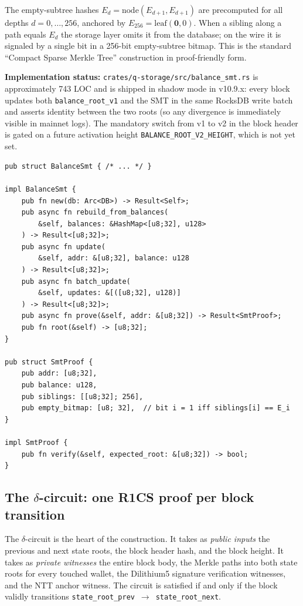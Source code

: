 \documentclass[11pt,a4paper]{article}
\begin{document}
The empty-subtree hashes
$E_d = \mathrm{node}(E_{d+1}, E_{d+1})$ are precomputed for all depths
$d = 0, \dots, 256$, anchored by $E_{256} = \mathrm{leaf}(\mathbf{0}, 0)$.
When a sibling along a path equals $E_d$ the storage layer omits it from
the database; on the wire it is signaled by a single bit in a 256-bit
empty-subtree bitmap. This is the standard ``Compact Sparse Merkle Tree''
construction in proof-friendly form.

\textbf{Implementation status:} \texttt{crates/q-storage/src/balance\_smt.rs}
is approximately 743 LOC and is shipped in shadow mode in
v10.9.x: every block updates both \texttt{balance\_root\_v1} and the
SMT in the same RocksDB write batch and asserts identity between the
two roots (so any divergence is immediately visible in mainnet logs).
The mandatory switch from v1 to v2 in the block header is gated on a
future activation height \texttt{BALANCE\_ROOT\_V2\_HEIGHT}, which is
not yet set.

\begin{lstlisting}[caption={Public API of the shipped sparse Merkle tree, \texttt{crates/q-storage/src/balance\_smt.rs}.},label={lst:smtapi}]
pub struct BalanceSmt { /* ... */ }

impl BalanceSmt {
    pub fn new(db: Arc<DB>) -> Result<Self>;
    pub async fn rebuild_from_balances(
        &self, balances: &HashMap<[u8;32], u128>
    ) -> Result<[u8;32]>;
    pub async fn update(
        &self, addr: &[u8;32], balance: u128
    ) -> Result<[u8;32]>;
    pub async fn batch_update(
        &self, updates: &[([u8;32], u128)]
    ) -> Result<[u8;32]>;
    pub async fn prove(&self, addr: &[u8;32]) -> Result<SmtProof>;
    pub fn root(&self) -> [u8;32];
}

pub struct SmtProof {
    pub addr: [u8;32],
    pub balance: u128,
    pub siblings: [[u8;32]; 256],
    pub empty_bitmap: [u8; 32],  // bit i = 1 iff siblings[i] == E_i
}

impl SmtProof {
    pub fn verify(&self, expected_root: &[u8;32]) -> bool;
}
\end{lstlisting}

\subsection{The $\delta$-circuit: one R1CS proof per block transition}

The $\delta$-circuit is the heart of the construction. It takes as
\emph{public inputs} the previous and next state roots, the block header
hash, and the block height. It takes as \emph{private witnesses} the
entire block body, the Merkle paths into both state roots for every
touched wallet, the Dilithium5 signature verification witnesses, and
the NTT anchor witness. The circuit is satisfied if and only if the
block validly transitions \texttt{state\_root\_prev}~$\to$~\texttt{state\_root\_next}.
\end{document}
